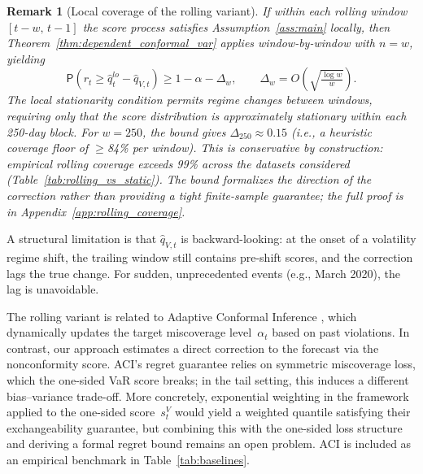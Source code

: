 \documentclass[preprint,11pt,authoryear]{elsarticle}
\newtheorem{remark}[theorem]{Remark}
\renewcommand{\P}{\mathsf{P}}
\newcommand{\1}{\boldsymbol{1}}
\begin{document}
	\begin{remark}[Local coverage of the rolling variant]
		\label{rem:rolling_coverage}
		If within each rolling window $[t-w,\, t-1]$ the score process satisfies Assumption~\ref{ass:main} locally, then Theorem~\ref{thm:dependent_conformal_var} applies window-by-window with $n = w$, yielding
		\[
		\P\!\left(r_t \geq \hat{q}_t^{lo} - \hat{q}_{V,t}\right) \geq 1 - \alpha - \Delta_w, \qquad \Delta_w = O\!\left(\sqrt{\tfrac{\log w}{w}}\right).
		\]
		The local stationarity condition permits regime changes \emph{between} windows, requiring only that the score distribution is approximately stationary within each 250-day block. For $w = 250$, the bound gives $\Delta_{250} \approx 0.15$ (i.e., a heuristic coverage floor of $\geq$84\% per window). This is conservative by construction: empirical rolling coverage exceeds 99\% across the datasets considered (Table~\ref{tab:rolling_vs_static}). The bound formalizes the direction of the correction rather than providing a tight finite-sample guarantee; the full proof is in Appendix~\ref{app:rolling_coverage}.
	\end{remark}

	A structural limitation is that $\hat{q}_{V,t}$ is
	backward-looking: at the onset of a volatility regime
	shift, the trailing window still contains pre-shift
	scores, and the correction lags the true change.
	For sudden, unprecedented
	events (e.g., March 2020), the lag is unavoidable.

	The rolling variant is related to Adaptive Conformal Inference \citep{gibbs2021adaptive}, which dynamically updates the target miscoverage level~$\alpha_t$ based on past violations. In contrast, our approach estimates a direct correction to the forecast via the nonconformity score. ACI's regret guarantee relies on symmetric miscoverage loss, which the one-sided VaR score breaks; in the tail setting, this induces a different bias--variance trade-off. More concretely, exponential weighting in the \citet{barber2023conformal} framework applied to the one-sided score~$s_t^V$ would yield a weighted quantile satisfying their exchangeability guarantee, but combining this with the one-sided loss structure and deriving a formal regret bound remains an open problem. ACI is included as an empirical benchmark in Table~\ref{tab:baselines}.

\end{document}
